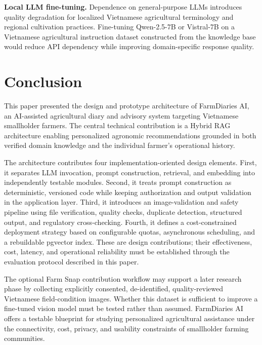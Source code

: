 \documentclass[conference]{IEEEtran}
\begin{document}
\textbf{Local LLM fine-tuning.} Dependence on general-purpose LLMs introduces quality degradation for localized Vietnamese agricultural terminology and regional cultivation practices. Fine-tuning Qwen-2.5-7B or Vistral-7B on a Vietnamese agricultural instruction dataset constructed from the knowledge base would reduce API dependency while improving domain-specific response quality.

\section{Conclusion}

This paper presented the design and prototype architecture of FarmDiaries AI, an AI-assisted agricultural diary and advisory system targeting Vietnamese smallholder farmers. The central technical contribution is a Hybrid RAG architecture enabling personalized agronomic recommendations grounded in both verified domain knowledge and the individual farmer's operational history.

The architecture contributes four implementation-oriented design elements. First, it separates LLM invocation, prompt construction, retrieval, and embedding into independently testable modules. Second, it treats prompt construction as deterministic, versioned code while keeping authorization and output validation in the application layer. Third, it introduces an image-validation and safety pipeline using file verification, quality checks, duplicate detection, structured output, and regulatory cross-checking. Fourth, it defines a cost-constrained deployment strategy based on configurable quotas, asynchronous scheduling, and a rebuildable pgvector index. These are design contributions; their effectiveness, cost, latency, and operational reliability must be established through the evaluation protocol described in this paper.

The optional Farm Snap contribution workflow may support a later research phase by collecting explicitly consented, de-identified, quality-reviewed Vietnamese field-condition images. Whether this dataset is sufficient to improve a fine-tuned vision model must be tested rather than assumed. FarmDiaries AI offers a testable blueprint for studying personalized agricultural assistance under the connectivity, cost, privacy, and usability constraints of smallholder farming communities.
\end{document}
